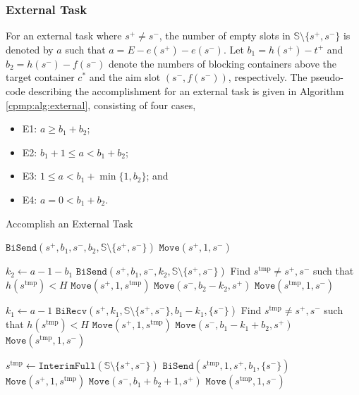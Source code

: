 \documentclass{article}
\newcommand{\mts}{s^\mathrm{tmp}}
\begin{document}
\subsubsection{External Task}

For an external task where $s^+\neq s^-$, the number of empty slots in $\mathbb{S}\setminus\{s^+,s^-\}$ is denoted by $a$ such that $a=E-e(s^+)-e(s^-)$. Let $b_1=h(s^+)-t^+$ and $b_2=h(s^-)-f(s^-)$ denote the numbers of blocking containers above the target container $c^*$ and the aim slot $(s^-,f(s^-))$, respectively. The pseudo-code describing the accomplishment for an external task is given in Algorithm \ref{cpmp:alg:external}, consisting of four cases,
\begin{itemize}[nosep]
\item E1: $a\ge b_1+b_2$;
\item E2: $b_1+1\le a<b_1+b_2$; 
\item E3: $1\le a<b_1+\min\{1,b_2\}$; and
\item E4: $a=0<b_1+b_2$.
\end{itemize}




\begin{algorithm}[htbp]
\caption{Accomplish an External Task}
\label{cpmp:alg:external}



  {
    $\mathtt{BiSend}(s^+, b_1,s^-,b_2, \mathbb{S}\setminus\{s^+,s^-\})$\;
    $\mathtt{Move}(s^+, 1, s^-)$\;
  }
  
  {
    $k_2\gets a-1-b_1$\;
    $\mathtt{BiSend}(s^+, b_1, s^-, k_2, \mathbb{S}\setminus\{s^+,s^-\})$\;
    Find $\mts\neq s^+,s^-$ such that $h(\mts)<H$\;
    $\mathtt{Move}(s^+,1,\mts)$\;
    $\mathtt{Move}(s^-, b_2-k_2, s^+)$\;
    $\mathtt{Move}(\mts, 1, s^-)$\;
  }

  {
    $k_1\gets a-1$\;
    $\mathtt{BiRecv}(s^+, k_1, \mathbb{S}\setminus\{s^+,s^-\}, b_1-k_1, \{s^-\})$\;
    Find $\mts\neq s^+,s^-$ such that $h(\mts)<H$\;
    $\mathtt{Move}(s^+,1,\mts)$\;
    $\mathtt{Move}(s^-, b_1-k_1+b_2, s^+)$\;
    $\mathtt{Move}(\mts, 1, s^-)$\;
  }
  
  {
    $\mts\gets \mathtt{InterimFull}(\mathbb{S}\setminus\{s^+,s^-\})$\;
    $\mathtt{BiSend}(\mts, 1, s^+, b_1, \{s^-\})$\;
    $\mathtt{Move}(s^+, 1, \mts)$\;
    $\mathtt{Move}(s^-, b_1+b_2+1, s^+)$\;
    $\mathtt{Move}(\mts, 1, s^-)$\;
  }
  
\end{algorithm}
\end{document}
